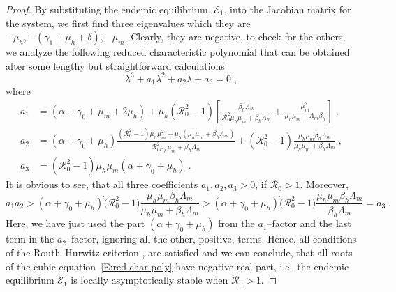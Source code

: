 \documentclass[preprint]{elsarticle}
\newcommand{\TG}[1]{\todo[linecolor=orange, backgroundcolor=orange!20, tickmarkheight=1ex]{TG: #1}}
\begin{document}
\begin{proof}
By substituting the endemic equilibrium, $\mathcal{E}_1$, into the Jacobian matrix for the system, we first find three eigenvalues which they are $-\mu_{h}, -(\gamma_{1}+\mu_{h}+\delta), -\mu_{m}$. Clearly, they are negative, to check for the others, we analyze the following reduced characteristic polynomial that can be obtained after some lengthy but straightforward calculations
\begin{equation}
    \label{E:red-char-poly}
    \lambda^3+a_1 \lambda^2+a_2 \lambda+a_3=0\;,
\end{equation}
where %
\begin{align*}
    a_1 &= (\alpha+\gamma_0+\mu_m+2\mu_h)+ \mu_h (\mathcal{R}_0^2-1) \left[\frac{\beta_h \Lambda_m}{\mathcal{R}_0^2 \mu_h \mu_m + \beta_h \Lambda_m} + \frac{\mu_m^2}{\mu_h \mu_m + \Lambda_m \beta_h}\right] \;, \\
    a_2 &= (\alpha+\gamma_0+\mu_h) \frac{(\mathcal{R}_0^2-1) \mu_h \mu_m^2+\mu_h(\mu_h \mu_m + \beta_h \Lambda_m)}{\mathcal{R}_0^2 \mu_h \mu_m + \beta_h \Lambda_m}
    + (\mathcal{R}_0^2-1) \frac{\mu_h \mu_m \beta_h \Lambda_m}{\mu_h \mu_m + \beta_h \Lambda_m}\;, \\
    a_3 &= (\mathcal{R}_0^2-1)\mu_h \mu_m (\alpha + \gamma_0 + \mu_h) \;.
\end{align*}
It is obvious to see, that all three coefficients $a_1, a_2, a_3>0$, if $\mathcal{R}_0>1$. Moreover,
\begin{equation*}
    a_1 a_2 > (\alpha+\gamma_0+\mu_h) \dot (\mathcal{R}_0^2-1) \frac{\mu_h \mu_m \beta_h \Lambda_m}{\mu_h \mu_m + \beta_h \Lambda_m} > (\alpha+\gamma_0+\mu_h) \dot (\mathcal{R}_0^2-1) \frac{\mu_h \mu_m \beta_h \Lambda_m}{ \beta_h \Lambda_m} = a_3\;.
\end{equation*}
Here, we have just used the part $(\alpha+\gamma_0+\mu_h)$ from the $a_1$--factor and the last term in the $a_2$--factor, ignoring all the other, positive, terms.
Hence, all conditions of the Routh--Hurwitz criterion \cite{Bavafa2017}, are satisfied and we can conclude, that all roots of the cubic equation~\eqref{E:red-char-poly} have negative real part, i.e.~the endemic equilibrium $\mathcal{E}_1$ is locally asymptotically stable when $\mathcal{R}_0 > 1$.
\end{proof}
\end{document}
